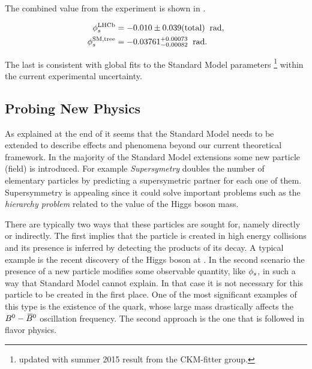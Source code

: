 \noindent The combined \phis value from the \lhcb experiment\cite{phis-3fb-paper} is shown in .

\begin{subequations}
  \begin{align}
  \centering
  \phiS{\lhcb}           &=  -0.010 \pm 0.039(\text{total})  \;\; \text{rad},
  \label{phis_lhcb}\\
  \phiS{SM,tree}  &= -0.03761 {}^{+0.00073}_{-0.00082}  \;\; \text{rad}.
  \label{phis_theo}
\end{align}
\end{subequations}

\noindent The last is consistent with global fits to the Standard Model parameters \cite{ckm-fitter-phis-pred}\footnote{updated with summer 2015 result from the CKM-fitter group.}
 within the current experimental uncertainty.

\subsection{Probing New Physics}
\label{probe_new_phys}

As explained at the end of  it seems that the Standard Model needs to be extended
to describe effects and phenomena beyond our current theoretical framework. In the majority of the Standard Model
extensions some new particle (field) is introduced. For example {\it Supersymetry} \cite{Golfand:1971iw,Volkov:1973ix,Wess:1974tw}
doubles the number of elementary particles by predicting a supersymetric partner for each one of them.
Supersymmetry is appealing since it could solve important problems such as the {\it hierarchy problem}
related to the value of the Higgs boson mass.

There are typically two ways that these particles are sought for, namely directly or indirectly. The first implies
that the particle is created in high energy collisions and its presence is inferred by detecting the products of
its decay. A typical example is the recent discovery of the Higgs boson at \lhc\cite{higgs-cms,higgs-atlas}.
In the second scenario the presence of a new particle modifies some observable quantity, like $\phi_{s}$, in such a way that Standard Model
cannot explain. In that case it is not necessary for this particle to be created in the first place.
One of the most significant examples of this type is the existence of the \tquark quark, whose large mass
drastically affects the $B^0-\kern 0.18em\overline{\kern -0.18em B}{}^0$ oscillation frequency\cite{argus-bbmix}. The second approach is the one
that is followed in flavor physics.

